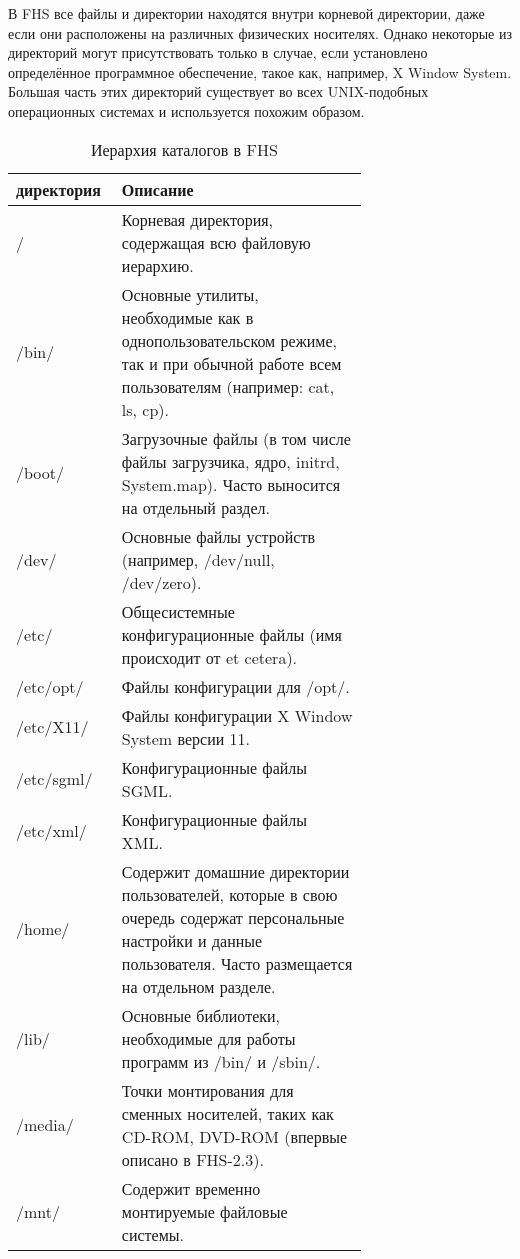 В FHS все файлы и директории находятся внутри корневой директории, даже если они расположены на различных физических носителях. Однако некоторые из директорий могут присутствовать только в случае, если установлено определённое программное обеспечение, такое как, например, X Window System. Большая часть этих директорий существует во всех UNIX-подобных операционных системах и используется похожим образом.
\begin{center}
\begin{longtable}[p]{|l|p{0.7\linewidth}|}
\caption{Иерархия каталогов в FHS}
\label{tabular:fhs}
\hline
директория & 	Описание \\
\hline
/  &	Корневая директория, содержащая всю файловую иерархию. \\
/bin/ & 	Основные утилиты, необходимые как в однопользовательском режиме, так и при обычной работе всем пользователям (например: cat, ls, cp). \\
/boot/ & 	Загрузочные файлы (в том числе файлы загрузчика, ядро, initrd, System.map). Часто выносится на отдельный раздел. \\
/dev/ &	Основные файлы устройств (например, /dev/null, /dev/zero). \\
/etc/ &	Общесистемные конфигурационные файлы (имя происходит от et cetera). \\
/etc/opt/ & Файлы конфигурации для /opt/. \\
/etc/X11/ & Файлы конфигурации X Window System версии 11. \\
/etc/sgml/ & Конфигурационные файлы SGML. \\
/etc/xml/ & Конфигурационные файлы XML. \\
/home/ & 	Содержит домашние директории пользователей, которые в свою очередь содержат персональные настройки и данные пользователя. Часто размещается на отдельном разделе. \\
/lib/ &	Основные библиотеки, необходимые для работы программ из /bin/ и /sbin/. \\
/media/ & 	Точки монтирования для сменных носителей, таких как CD-ROM, DVD-ROM (впервые описано в FHS-2.3). \\
/mnt/ & 	Содержит временно монтируемые файловые системы. \\

\end{longtable}
\end{center}
